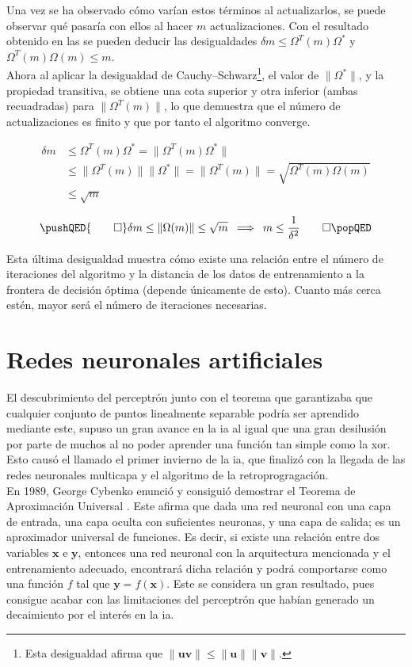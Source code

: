 		Una vez se ha observado cómo varían estos términos al actualizarlos, se puede observar qué pasaría con ellos al hacer $m$ actualizaciones. Con el resultado obtenido en las  se pueden deducir las desigualdades $\delta m \leq \Omega^T(m)\Omega^*$ y $\Omega^T(m)\Omega(m) \leq m$. \\
		
		Ahora al aplicar la desigualdad de Cauchy--Schwarz\footnote{Esta desigualdad afirma que $\|\textbf{u}\textbf{v}\| \leq \|\textbf{u}\|\|\textbf{v}\|$. }, el valor de $\|\Omega^*\|$, y la propiedad transitiva, se obtiene una cota superior y otra inferior (ambas recuadradas) para $\|\Omega^T(m)\|$, lo que demuestra que el número de actualizaciones es finito y que por tanto el algoritmo converge. 
		
		\begin{align*}
			\boxed{\delta m} &\leq \Omega^T(m)\Omega^* = \|\Omega^T(m)\Omega^*\|\\
			&\leq \|\Omega^T(m)\| \|\Omega^*\| = \|\Omega^T(m)\| = \sqrt{\Omega^T(m)\Omega(m)}\\
			& \leq \boxed{\sqrt{m}} 
		\end{align*}
		
		$$
		\pushQED{\qed} 
		\delta m \leq \|\Omega(m)\| \leq \sqrt{m} \,\,\, \Longrightarrow \,\,\, m \leq \frac{1}{\delta^2}\qedhere
		\popQED
		$$ 
		
		Esta última desigualdad muestra cómo existe una relación entre el número de iteraciones del algoritmo y la distancia de los datos de entrenamiento a la frontera de decisión óptima (depende únicamente de esto). Cuanto más cerca estén, mayor será el número de iteraciones necesarias. 
		
	\section{Redes neuronales artificiales}
	
		El descubrimiento del perceptrón junto con el teorema que garantizaba que cualquier conjunto de puntos linealmente separable podría ser aprendido mediante este, supuso un gran avance en la \gls{ia} al igual que una gran desilusión por parte de muchos al no poder aprender una función tan simple como la \gls{xor}. Esto causó el llamado el primer invierno de la \gls{ia}, que finalizó con la llegada de las redes neuronales multicapa y el algoritmo de la retroprogragación. \\
		
		En 1989, George Cybenko enunció y consiguió demostrar el Teorema de Aproximación Universal \cite{teoremaAproximacion}. Este afirma que dada una red neuronal con una capa de entrada, una capa oculta con suficientes neuronas, y una capa de salida; es un aproximador universal de funciones. Es decir, si existe una relación entre dos variables $\textbf{x}$ e $\textbf{y}$, entonces una red neuronal con la arquitectura mencionada y el entrenamiento adecuado, encontrará dicha relación y podrá comportarse como una función $f$ tal que $\textbf{y} = f(\textbf{x})$. Este se considera un gran resultado, pues consigue acabar con las limitaciones del perceptrón que habían generado un decaimiento por el interés en la \gls{ia}. \\
		
